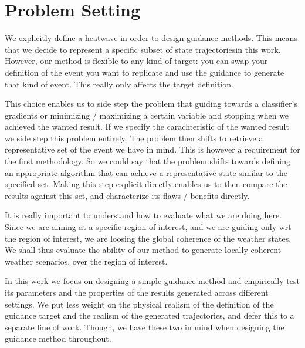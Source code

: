 \chapter{Problem Setting}

We explicitly define a heatwave in order to design guidance methods. 
This means that we decide to represent a specific subset of state trajectoriesin this work.
However, our method is flexible to any kind of target: you can swap your definition of the event you want to replicate and use the guidance to generate that kind of event.
This really only affects the target definition.

This choice enables us to side step the problem that guiding towards a classifier's gradients or minimizing / maximizing a certain variable and stopping when we achieved the wanted result.
If we specify the carachteristic of the wanted result we side step this problem entirely.
The problem then shifts to retrieve a representative set of the event we have in mind.
This is however a requirement for the first methodology.
So we could say that the problem shifts towards defining an appropriate algorithm that can achieve a representative state similar to the specified set.
Making this step explicit directly enables us to then compare the results against this set,
and characterize its flaws / benefits directly.

It is really important to understand how to evaluate what we are doing here.
Since we are aiming at a specific region of interest, and we are guiding only wrt the region of interest, 
we are loosing the global coherence of the weather states.
We shall thus evaluate the ability of our method to generate locally coherent weather scenarios, over the region of interest.

In this work we focus on designing a simple guidance method and empirically test its parameters and the properties of the results generated across different settings.
We put less weight on the physical realism of the definition of the guidance target and the realism of the generated trajectories,
and defer this to a separate line of work.
Though, we have these two in mind when designing the guidance method throughout.
